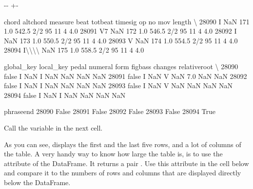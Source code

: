 \documentclass[letterpaper,10pt,english]{sphinxmanual}
\newlength\nbsphinxcodecellspacing
\begin{document}
{

\kern-\sphinxverbatimsmallskipamount\kern-\baselineskip
\kern+\FrameHeightAdjust\kern-\fboxrule
\vspace{\nbsphinxcodecellspacing}

\begin{sphinxVerbatim}[commandchars=\\\{\}]
\llap{\color{nbsphinxout}[7]:\,\hspace{\fboxrule}\hspace{\fboxsep}}       chord altchord  measure  beat  totbeat timesig  op  no  mov  length  \textbackslash{}
28090      I      NaN      171   1.0    542.5     2/2  95  11    4     4.0
28091     V7      NaN      172   1.0    546.5     2/2  95  11    4     4.0
28092      I      NaN      173   1.0    550.5     2/2  95  11    4     4.0
28093      V      NaN      174   1.0    554.5     2/2  95  11    4     4.0
28094  I\textbackslash{}\textbackslash{}\textbackslash{}\textbackslash{}      NaN      175   1.0    558.5     2/2  95  11    4     4.0

      global\_key local\_key pedal numeral form  figbass changes relativeroot  \textbackslash{}
28090      false         I   NaN       I  NaN      NaN     NaN          NaN
28091      false         I   NaN       V  NaN      7.0     NaN          NaN
28092      false         I   NaN       I  NaN      NaN     NaN          NaN
28093      false         I   NaN       V  NaN      NaN     NaN          NaN
28094      false         I   NaN       I  NaN      NaN     NaN          NaN

       phraseend
28090      False
28091      False
28092      False
28093      False
28094       True
\end{sphinxVerbatim}
}

Call the variable  in the next cell.

{
\begin{sphinxVerbatim}[commandchars=\\\{\}]
\llap{\color{nbsphinxin}[ ]:\,\hspace{\fboxrule}\hspace{\fboxsep}}
\end{sphinxVerbatim}
}

As you can see,  displays the first and the last five rows, and a lot of columns of the table. A very handy way to know how large the table is, is to use the  attribute of the  DataFrame. It returns a pair . Use this attribute in the cell below and compare it to the numbers of rows and columns that are displayed directly below the DataFrame.
\end{document}
